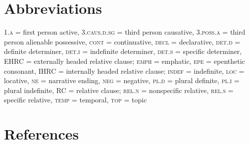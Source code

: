 \documentclass[output=paper]{LSP/langsci}
\begin{document}
\section*{Abbreviations}

\textsc{1.a} = first person active, \textsc{3.caus.d.sg} = third person causative, \textsc{3.poss.a} = third person alienable possessive, \textsc{cont} = continuative, \textsc{decl} = declarative, \textsc{det.d} = definite determiner, \textsc{det.i} = indefinite determiner, \textsc{det.s} = specific determiner, EHRC = externally headed relative clause; \textsc{emph} = emphatic, \textsc{epe} = epenthetic consonant, IHRC = internally headed relative clause; \textsc{indef} = indefinite, \textsc{loc} = locative, \textsc{ne} = narrative ending, \textsc{neg} = negative, \textsc{pl.d} = plural definite, \textsc{pl.i} = plural indefinite, RC = relative clause; \textsc{rel.n} = nonspecific relative, \textsc{rel.s} = specific relative, \textsc{temp} = temporal, \textsc{top} = topic

\section*{References} 

\printbibliography 
\end{document}
